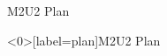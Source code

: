 \begin{frame}{M2U2 Plan}
	\tableofcontents
\end{frame}
%
%
\begin{frame}<0>[label=plan]{M2U2 Plan}
	\tableofcontents[currentsection]
\end{frame}